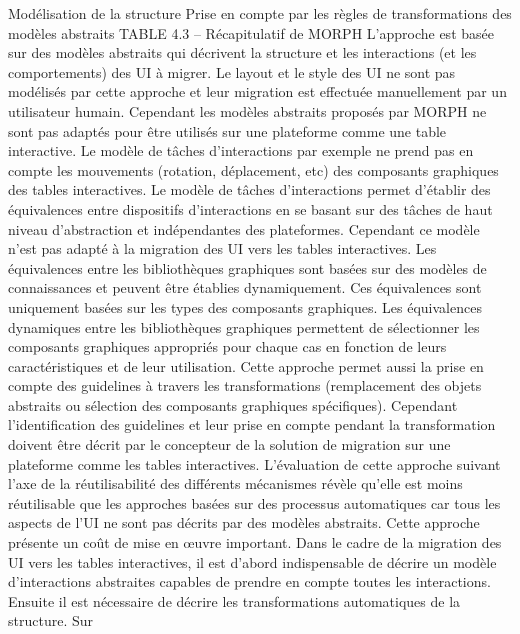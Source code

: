 \documentclass{article}
\begin{document}
Mod\'{e}lisation de la
structure
Prise en compte par les
r\`{e}gles de
transformations des
mod\`{e}les abstraits
TABLE 4.3 – R\'{e}capitulatif de MORPH
L’approche est bas\'{e}e sur des mod\`{e}les abstraits qui d\'{e}crivent la structure et les interactions (et les
comportements) des UI \`{a} migrer. Le layout et le style des UI ne sont pas mod\'{e}lis\'{e}s par cette approche
et leur migration est effectu\'{e}e manuellement par un utilisateur humain. Cependant les mod\`{e}les abstraits propos\'{e}s par MORPH ne sont pas adapt\'{e}s pour \^{e}tre utilis\'{e}s sur une plateforme comme une table
interactive. Le mod\`{e}le de t\^{a}ches d’interactions par exemple ne prend pas en compte les mouvements
(rotation, d\'{e}placement, etc) des composants graphiques des tables interactives. Le mod\`{e}le de t\^{a}ches
d’interactions permet d’\'{e}tablir des \'{e}quivalences entre dispositifs d’interactions en se basant sur des
t\^{a}ches de haut niveau d’abstraction et ind\'{e}pendantes des plateformes. Cependant ce mod\`{e}le n’est pas
adapt\'{e} \`{a} la migration des UI vers les tables interactives.
Les \'{e}quivalences entre les biblioth\`{e}ques graphiques sont bas\'{e}es sur des mod\`{e}les de connaissances
et peuvent \^{e}tre \'{e}tablies dynamiquement. Ces \'{e}quivalences sont uniquement bas\'{e}es sur les types des
composants graphiques.
Les \'{e}quivalences dynamiques entre les biblioth\`{e}ques graphiques permettent de s\'{e}lectionner les
composants graphiques appropri\'{e}s pour chaque cas en fonction de leurs caract\'{e}ristiques et de leur
utilisation.
Cette approche permet aussi la prise en compte des guidelines \`{a} travers les transformations (remplacement des objets abstraits ou s\'{e}lection des composants graphiques sp\'{e}ciﬁques). Cependant l’identiﬁcation des guidelines et leur prise en compte pendant la transformation doivent \^{e}tre d\'{e}crit par le
concepteur de la solution de migration sur une plateforme comme les tables interactives.
L’\'{e}valuation de cette approche suivant l’axe de la r\'{e}utilisabilit\'{e} des diff\'{e}rents m\'{e}canismes r\'{e}v\`{e}le
qu’elle est moins r\'{e}utilisable que les approches bas\'{e}es sur des processus automatiques car tous les
aspects de l’UI ne sont pas d\'{e}crits par des mod\`{e}les abstraits. Cette approche pr\'{e}sente un co\^{u}t de mise
en œuvre important. Dans le cadre de la migration des UI vers les tables interactives, il est d’abord
indispensable de d\'{e}crire un mod\`{e}le d’interactions abstraites capables de prendre en compte toutes les
interactions. Ensuite il est n\'{e}cessaire de d\'{e}crire les transformations automatiques de la structure. Sur
\end{document}
